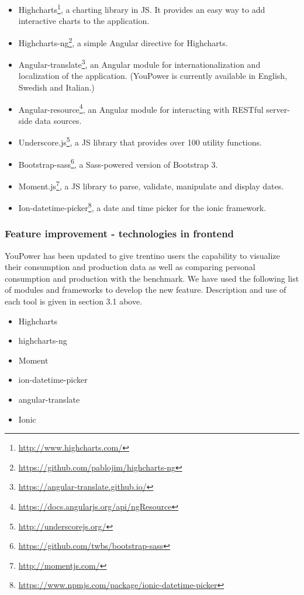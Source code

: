 \begin{itemize}

\item Highcharts\footnote{\url{http://www.highcharts.com/}}, a charting library in JS. It provides an easy way to add interactive charts to the application. 

\item Highcharts-ng\footnote{\url{https://github.com/pablojim/highcharts-ng}}, a simple Angular directive for Highcharts. 

\item Angular-translate\footnote{\url{https://angular-translate.github.io/}}, an Angular module for internationalization and localization of the application. (YouPower is currently available in English, Swedish and Italian.)

\item Angular-resource\footnote{\url{https://docs.angularjs.org/api/ngResource}}, an Angular module for interacting with RESTful server-side data sources. 

\item Underscore.js\footnote{\url{http://underscorejs.org/}}, a JS library that provides over 100 utility functions. 

\item Bootstrap-sass\footnote{\url{https://github.com/twbs/bootstrap-sass}}, a Sass-powered version of Bootstrap 3. 

\item Moment.js\footnote{\url{http://momentjs.com/}}, a JS library to parse, validate, manipulate and display dates. 

\item Ion-datetime-picker\footnote{\url{https://www.npmjs.com/package/ionic-datetime-picker}}, a date and time picker for the ionic framework. 

\end{itemize}
\subsubsection{Feature improvement - technologies in frontend}
YouPower has been updated to give trentino users the capability to visualize their consumption and production data as well as comparing personal consumption and production with the benchmark. We have used the following list of modules and frameworks to develop the new feature. Description and use of each tool is given in section 3.1 above.
\begin{itemize}
\item Highcharts
\item highcharts-ng
\item Moment
\item ion-datetime-picker
\item angular-translate
\item Ionic
\end{itemize}
